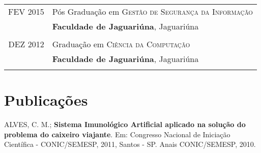 \documentclass[a4paper,10pt]{article} %
\begin{document}
\begin{tabular}{rl}	
\textsc{FEV} 2015 & Pós Graduação em \textsc{Gestão de Segurança da Informação} \\& \normalsize\textbf{Faculdade de Jaguariúna}, Jaguariúna\\
&\\


\textsc{DEZ} 2012& Graduação em \textsc{}\textsc{Ciência da Computação} \\& \normalsize\textbf{Faculdade de Jaguariúna}, Jaguariúna\\
&\\




\end{tabular}


\section{Publicações}

ALVES, C. M.; \textbf{Sistema Imunológico Artificial aplicado na solução do problema do caixeiro viajante}. Em: Congresso Nacional de Iniciação Científica - CONIC/SEMESP, 2011, Santos - SP. Anais CONIC/SEMESP, 2010.
\end{document}
